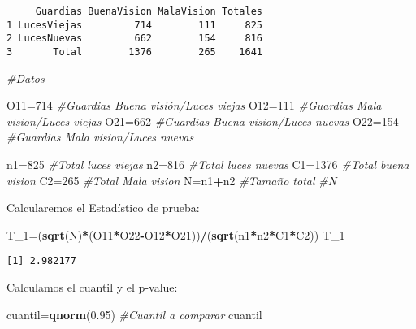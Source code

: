 \documentclass[a4paper,oneside,openany]{book}
\newenvironment{Shaded}{\begin{snugshade}}{\end{snugshade}}
\newcommand{\KeywordTok}[1]{\textcolor[rgb]{0.13,0.29,0.53}{\textbf{#1}}}
\newcommand{\DecValTok}[1]{\textcolor[rgb]{0.00,0.00,0.81}{#1}}
\newcommand{\FloatTok}[1]{\textcolor[rgb]{0.00,0.00,0.81}{#1}}
\newcommand{\CommentTok}[1]{\textcolor[rgb]{0.56,0.35,0.01}{\textit{#1}}}
\newcommand{\OperatorTok}[1]{\textcolor[rgb]{0.81,0.36,0.00}{\textbf{#1}}}
\newcommand{\NormalTok}[1]{#1}
\begin{document}
\begin{verbatim}
     Guardias BuenaVision MalaVision Totales
1 LucesViejas         714        111     825
2 LucesNuevas         662        154     816
3       Total        1376        265    1641
\end{verbatim}

\begin{Shaded}
\begin{Highlighting}[]
\CommentTok{#Datos}

\NormalTok{O11=}\DecValTok{714}    \CommentTok{#Guardias Buena visión/Luces viejas}
\NormalTok{O12=}\DecValTok{111}    \CommentTok{#Guardias Mala vision/Luces viejas}
\NormalTok{O21=}\DecValTok{662}    \CommentTok{#Guardias Buena vision/Luces nuevas}
\NormalTok{O22=}\DecValTok{154}    \CommentTok{#Guardias Mala vision/Luces nuevas}

\NormalTok{n1=}\DecValTok{825}      \CommentTok{#Total luces viejas         }
\NormalTok{n2=}\DecValTok{816}      \CommentTok{#Total luces nuevas}
\NormalTok{C1=}\DecValTok{1376}     \CommentTok{#Total buena vision}
\NormalTok{C2=}\DecValTok{265}      \CommentTok{#Total Mala vision}
\NormalTok{N=n1}\OperatorTok{+}\NormalTok{n2     }\CommentTok{#Tamaño total }
\CommentTok{#N}
\end{Highlighting}
\end{Shaded}

Calcularemos el Estadístico de prueba:

\begin{Shaded}
\begin{Highlighting}[]
\NormalTok{T_}\DecValTok{1}\NormalTok{=(}\KeywordTok{sqrt}\NormalTok{(N)}\OperatorTok{*}\NormalTok{(O11}\OperatorTok{*}\NormalTok{O22}\OperatorTok{-}\NormalTok{O12}\OperatorTok{*}\NormalTok{O21))}\OperatorTok{/}\NormalTok{(}\KeywordTok{sqrt}\NormalTok{(n1}\OperatorTok{*}\NormalTok{n2}\OperatorTok{*}\NormalTok{C1}\OperatorTok{*}\NormalTok{C2))}
\NormalTok{T_}\DecValTok{1}
\end{Highlighting}
\end{Shaded}

\begin{verbatim}
[1] 2.982177
\end{verbatim}

Calculamos el cuantil y el p-value:

\begin{Shaded}
\begin{Highlighting}[]
\NormalTok{cuantil=}\KeywordTok{qnorm}\NormalTok{(}\FloatTok{0.95}\NormalTok{)  }\CommentTok{#Cuantil a comparar}
\NormalTok{cuantil}
\end{Highlighting}
\end{Shaded}
\end{document}

